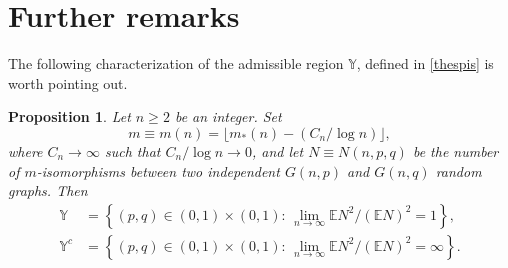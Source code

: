 \documentclass[reqno]{amsart}
\theoremstyle{theorem}
\newtheorem{proposition}[theorem]{Proposition}
\theoremstyle{definition}
\theoremstyle{remark}
\def\E{\mathbb{E}}
\newcommand{\1}{{\text{\Large $\mathfrak 1$}}}	%
\numberwithin{equation}{section}
\def\Y{\mathbb{Y}}
\begin{document}
\section{\bfseries Further remarks}
The following characterization of the admissible region $\Y$,
defined in \eqref{thespis} is worth pointing out.
\begin{proposition}
\label{propc}
Let $n \ge 2$ be an integer.
Set
\[
m \equiv m(n) = \lfloor m_*(n)-(C_n/\log n)\rfloor,
\]
where $C_n \to \infty$ such that $C_n/\log n \to 0$,
and let $N\equiv N(n,p,q)$ be the number of $m$-isomorphisms between two independent
$G(n,p)$ and $G(n,q)$ random graphs. 
Then
\begin{align*}
\Y &= \left\{(p,q) \in (0,1)\times (0,1): \, \lim_{n \to \infty}
\E N^2/(\E N)^2 = 1\right\},
\\
\Y^c &= \left\{(p,q) \in (0,1)\times (0,1): \, \lim_{n \to \infty}
\E N^2/(\E N)^2 = \infty\right\}.
\end{align*}
\end{proposition}
\end{document}
